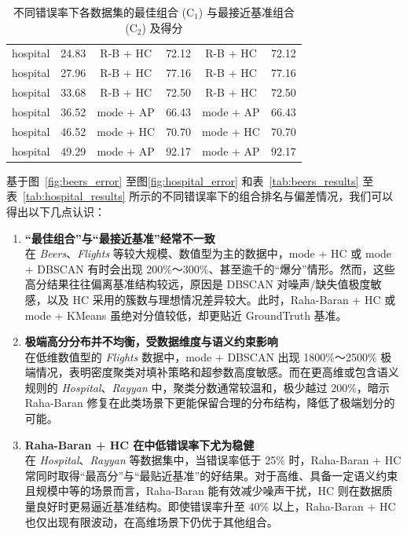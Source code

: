 \documentclass[10pt]{article} %
\numberwithin{equation}{section}
\begin{document}
\begin{table}[htbp]
\begin{subtable}{0.48\linewidth}
\begin{tabular}{lccccc}
            hospital & 24.83 & R-B + HC  & 72.12  & R-B + HC  & 72.12  \\
            hospital & 27.96 & R-B + HC  & 77.16  & R-B + HC  & 77.16  \\
            hospital & 33.68 & R-B + HC  & 72.50  & R-B + HC  & 72.50  \\
            hospital & 36.52 & mode + AP & 66.43  & mode + AP & 66.43  \\
            hospital & 46.52 & mode + HC & 70.70  & mode + HC & 70.70  \\
            hospital & 49.29 & mode + AP & 92.17  & mode + AP & 92.17  \\
            \bottomrule
        \end{tabular}
    \end{subtable}

    \caption{不同错误率下各数据集的最佳组合 (C$_1$) 与最接近基准组合 (C$_2$) 及得分}
    \label{tab:all_results}
\end{table}

\vspace{0.5em}
\noindent
基于图~\ref{fig:beers_error} 至图\ref{fig:hospital_error} 和表~\ref{tab:beers_results} 至表~\ref{tab:hospital_results} 所示的不同错误率下的组合排名与偏差情况，我们可以得出以下几点认识：

\begin{enumerate}
    \item \textbf{“最佳组合”与“最接近基准”经常不一致}\\
    在 \textit{Beers}、\textit{Flights} 等较大规模、数值型为主的数据中，mode + HC 或 mode + DBSCAN 有时会出现 200\%～300\%、甚至逾千的“爆分”情形。然而，这些高分结果往往偏离基准结构较远，原因是 DBSCAN 对噪声/缺失值极度敏感，以及 HC 采用的簇数与理想情况差异较大。此时，Raha-Baran + HC 或 mode + KMeans 虽绝对分值较低，却更贴近 GroundTruth 基准。

    \item \textbf{极端高分分布并不均衡，受数据维度与语义约束影响}\\
    在低维数值型的 \textit{Flights} 数据中，mode + DBSCAN 出现 1800\%～2500\% 极端情况，表明密度聚类对填补策略和超参数高度敏感。而在更高维或包含语义规则的 \textit{Hospital}、\textit{Rayyan} 中，聚类分数通常较温和，极少越过 200\%，暗示 Raha-Baran 修复在此类场景下更能保留合理的分布结构，降低了极端划分的可能。

    \item \textbf{Raha-Baran + HC 在中低错误率下尤为稳健}\\
    在 \textit{Hospital}、\textit{Rayyan} 等数据集中，当错误率低于 25\% 时，Raha-Baran + HC 常同时取得“最高分”与“最贴近基准”的好结果。对于高维、具备一定语义约束且规模中等的场景而言，Raha-Baran 能有效减少噪声干扰，HC 则在数据质量良好时更易逼近基准结构。即使错误率升至 40\% 以上，Raha-Baran + HC 也仅出现有限波动，在高维场景下仍优于其他组合。
\end{enumerate}
\end{document}
